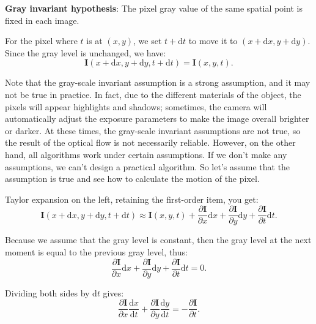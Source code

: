 \textbf{Gray invariant hypothesis}: The pixel gray value of the same spatial point is fixed in each image.

For the pixel where $t$ is at $(x,y)$, we set $t+\mathrm{d}t$ to move it to $(x+\mathrm{d}x, y+\mathrm{d}y) $. Since the gray level is unchanged, we have:
\begin{equation}
\bm{I}(x+\mathrm{d}x, y+\mathrm{d}y, t+\mathrm{d}t) = \bm{I} (x,y,t).
\end{equation}

Note that the gray-scale invariant assumption is a strong assumption, and it may not be true in practice. In fact, due to the different materials of the object, the pixels will appear highlights and shadows; sometimes, the camera will automatically adjust the exposure parameters to make the image overall brighter or darker. At these times, the gray-scale invariant assumptions are not true, so the result of the optical flow is not necessarily reliable. However, on the other hand, all algorithms work under certain assumptions. If we don't make any assumptions, we can't design a practical algorithm. So let's assume that the assumption is true and see how to calculate the motion of the pixel.

Taylor expansion on the left, retaining the first-order item, you get:
\begin{equation}
\bm{I} \left( {x + \mathrm{d}x,y + \mathrm{d}y,t + \mathrm{d}t} \right) \approx \bm{I} \left( { x,y,t} \right) + \frac{{\partial \bm{I} }}{{\partial x}}\mathrm{d}x + \frac{{\partial \bm{I}}} {{\partial y}}\mathrm{d}y + \frac{{\partial \bm{I}}}{{\partial t}}\mathrm{d}t.
\end{equation}

Because we assume that the gray level is constant, then the gray level at the next moment is equal to the previous gray level, thus:
\begin{equation}
 \frac{{\partial \bm{I} }}{{\partial x}}\mathrm{d}x + \frac{{\partial \bm{I}}}{{\partial y}}\mathrm{ d}y + \frac{{\partial \bm{I}}}{{\partial t}}\mathrm{d}t = 0.
\end{equation}

Dividing both sides by $\mathrm{d}t$ gives:
\begin{equation}\label{key}
 \frac{{\partial \bm{I} }}{{\partial x}} \frac{\mathrm{d}x}{\mathrm{d}t} + \frac{{\partial \bm{I} }}{{\partial y}} \frac{\mathrm{d}y}{\mathrm{d}t} =- \frac{{\partial \bm{I}}}{{\partial t}}.
\end{equation}

